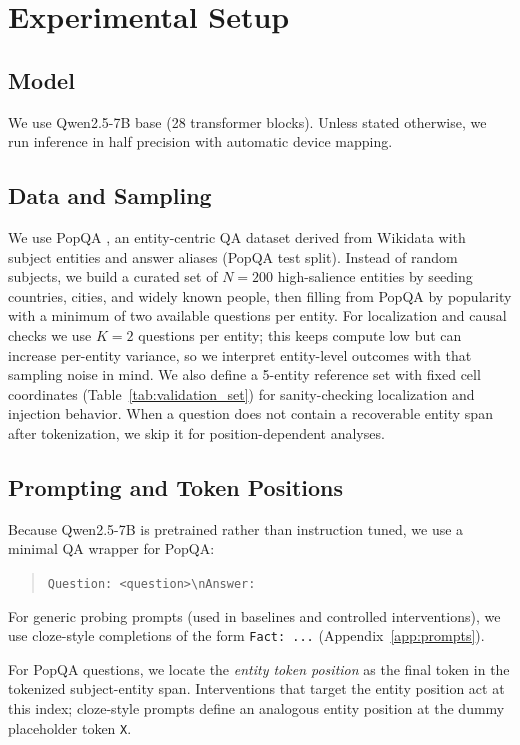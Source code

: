 \documentclass[10pt,twocolumn]{article}
\begin{document}
\section{Experimental Setup}
\subsection{Model}
We use Qwen2.5-7B base \cite{qwen25} (28 transformer blocks). Unless stated otherwise, we run inference in half precision with automatic device mapping.

\subsection{Data and Sampling}
We use PopQA \cite{popqa}, an entity-centric QA dataset derived from Wikidata with subject entities and answer aliases (PopQA test split). Instead of random subjects, we build a curated set of $N=200$ high-salience entities by seeding countries, cities, and widely known people, then filling from PopQA by popularity with a minimum of two available questions per entity. For localization and causal checks we use $K=2$ questions per entity; this keeps compute low but can increase per-entity variance, so we interpret entity-level outcomes with that sampling noise in mind. We also define a 5-entity reference set with fixed cell coordinates (Table~\ref{tab:validation_set}) for sanity-checking localization and injection behavior. When a question does not contain a recoverable entity span after tokenization, we skip it for position-dependent analyses.

\subsection{Prompting and Token Positions}
Because Qwen2.5-7B is pretrained rather than instruction tuned, we use a minimal QA wrapper for PopQA:
\begin{quote}
\small \texttt{Question: <question>\textbackslash{}nAnswer:}
\end{quote}
For generic probing prompts (used in baselines and controlled interventions), we use cloze-style completions of the form \texttt{Fact: ...} (Appendix~\ref{app:prompts}).

For PopQA questions, we locate the \emph{entity token position} as the final token in the tokenized subject-entity span. Interventions that target the entity position act at this index; cloze-style prompts define an analogous entity position at the dummy placeholder token \texttt{X}.
\end{document}
